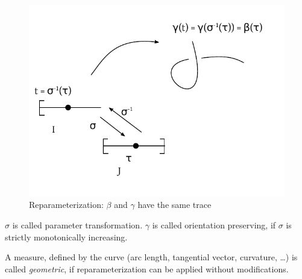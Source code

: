 \documentclass[a4paper,landscape,twocolumn]{article}
\theoremstyle{definition}
\begin{document}
\begin{figure}[!h]
  \begin{center}
    \includegraphics{img/reparameterization.pdf}
    \caption{Reparameterization: $\beta$ and $\gamma$ have the same trace}
    \label{img:reparam}
  \end{center}
\end{figure}

$\sigma$ is called parameter transformation.
$\gamma$ is called orientation preserving, if $\sigma$ is strictly monotonically increasing.

A measure, defined by the curve (arc length, tangential vector, curvature, \dots)
is called \emph{geometric}, if reparameterization can be applied without modifications.
\end{document}
